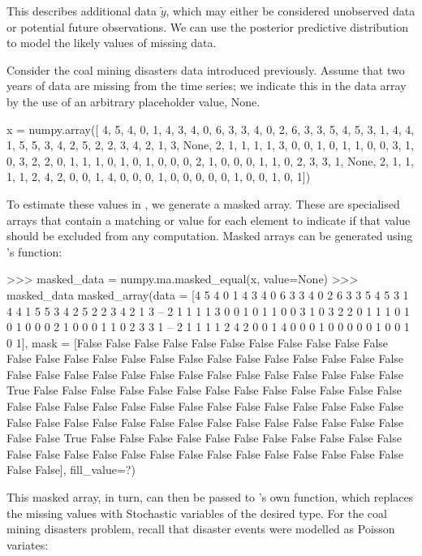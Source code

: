 \documentclass[]{jss}
\begin{document}
This describes additional data $\tilde{y}$, which may either be considered unobserved data or potential future observations. We can use the posterior predictive distribution to model the likely values of missing data.

Consider the coal mining disasters data introduced previously. Assume that two years of data are missing from the time series; we indicate this in the data array by the use of an arbitrary placeholder value, None.

\begin{CodeInput}
x = numpy.array([ 4, 5, 4, 0, 1, 4, 3, 4, 0, 6, 3, 3, 4, 0, 2, 6,
3, 3, 5, 4, 5, 3, 1, 4, 4, 1, 5, 5, 3, 4, 2, 5,
2, 2, 3, 4, 2, 1, 3, None, 2, 1, 1, 1, 1, 3, 0, 0,
1, 0, 1, 1, 0, 0, 3, 1, 0, 3, 2, 2, 0, 1, 1, 1,
0, 1, 0, 1, 0, 0, 0, 2, 1, 0, 0, 0, 1, 1, 0, 2,
3, 3, 1, None, 2, 1, 1, 1, 1, 2, 4, 2, 0, 0, 1, 4,
0, 0, 0, 1, 0, 0, 0, 0, 0, 1, 0, 0, 1, 0, 1])
\end{CodeInput}

To estimate these values in , we generate a masked array. These are specialised  arrays that contain a matching  or  value for each element to indicate if that value should be excluded from any computation. Masked arrays can be generated using 's  function:
\begin{CodeInput}
>>> masked_data = numpy.ma.masked_equal(x, value=None)
>>> masked_data
masked_array(data = [4 5 4 0 1 4 3 4 0 6 3 3 4 0 2 6 3 3 5 4 5 3 1 4 4 1 5 5 3
 4 2 5 2 2 3 4 2 1 3 -- 2 1 1 1 1 3 0 0 1 0 1 1 0 0 3 1 0 3 2 2 0 1 1 1 0 1 0
 1 0 0 0 2 1 0 0 0 1 1 0 2 3 3 1 -- 2 1 1 1 1 2 4 2 0 0 1 4 0 0 0 1 0 0 0 0 0 1
 0 0 1 0 1],
 mask = [False False False False False False False False False False False False
 False False False False False False False False False False False False
 False False False False False False False False False False False False
 False False False  True False False False False False False False False
 False False False False False False False False False False False False
 False False False False False False False False False False False False
 False False False False False False False False False False False  True
 False False False False False False False False False False False False
 False False False False False False False False False False False False
 False False False],
  fill_value=?)

\end{CodeInput}

This masked array, in turn, can then be passed to 's own  function, which replaces the missing values with Stochastic variables of the desired type. For the coal mining disasters problem, recall that disaster events were modelled as Poisson variates:
\end{document}

